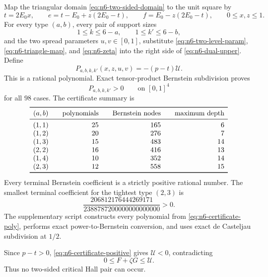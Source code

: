 \documentclass[11pt]{article}
\theoremstyle{definition}
\newcommand{\1}{\mathbf{1}}
\begin{document}
Map the triangular domain \eqref{eq:n6-two-sided-domain} to the unit square
by
\begin{equation}\label{eq:n6-triangle-map}
 t=2E_0x,
 \qquad
 e=t-E_0+z(2E_0-t),
 \qquad
 f=E_0-z(2E_0-t),
 \qquad 0\le x,z\le1.
\end{equation}
For every type $(a,b)$, every pair of support sizes
\[
 1\le k\le6-a,
 \qquad
 1\le k'\le6-b,
\]
and the two spread parameters $u,v\in[0,1]$, substitute
\eqref{eq:n6-two-level-param}, \eqref{eq:n6-triangle-map}, and
\eqref{eq:n6-zeta} into the right side of
\eqref{eq:n6-dual-upper}.  Define
\begin{equation}\label{eq:n6-certificate-poly}
 P_{a,b,k,k'}(x,z,u,v)=-(p-t)\mathcal U.
\end{equation}
This is a rational polynomial.  Exact tensor-product Bernstein subdivision
proves
\begin{equation}\label{eq:n6-certificate-positive}
 P_{a,b,k,k'}>0\qquad\text{on }[0,1]^4
\end{equation}
for all $98$ cases.  The certificate summary is
\begin{equation}\label{eq:n6-two-sided-table}
\begin{array}{c@{\qquad}r@{\qquad}r@{\qquad}r}
\toprule
(a,b)&\text{polynomials}&\text{Bernstein nodes}&\text{maximum depth}\\
\midrule
(1,1)&25&165&6\\
(1,2)&20&276&7\\
(1,3)&15&483&14\\
(2,2)&16&416&13\\
(1,4)&10&352&14\\
(2,3)&12&558&15\\
\bottomrule
\end{array}
\end{equation}
Every terminal Bernstein coefficient is a strictly positive rational
number.  The smallest terminal coefficient for the tightest type $(2,3)$ is
\begin{equation}\label{eq:n6-smallest-fourvar}
 \frac{206812176444269171}
 {2388787200000000000000}>0.
\end{equation}
The supplementary script constructs every polynomial from
\eqref{eq:n6-certificate-poly}, performs exact power-to-Bernstein conversion,
and uses exact de Casteljau subdivision at $1/2$.

Since $p-t>0$, \eqref{eq:n6-certificate-positive} gives $\mathcal U<0$,
contradicting
\[
 0\le F+\zeta G\le\mathcal U.
\]
Thus no two-sided critical Hall pair can occur.
\end{document}
